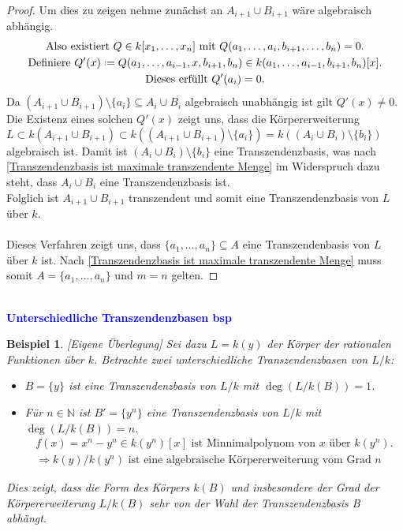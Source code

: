 \documentclass[10pt,a4paper]{report}
\newcommand{\comment}[1]{}
\newcounter{Aussage}[chapter]
\newtheorem{bsp}[Aussage]{Beispiel}
\newcommand*{\defeq}{\mathrel{\vcenter{\baselineskip0.5ex \lineskiplimit0pt
                     \hbox{\scriptsize.}\hbox{\scriptsize.}}}%
                     =}
\begin{document}
\begin{proof}
Um dies zu zeigen nehme zunächst an $A_{i+1} \cup B_{i+1}$ wäre algebraisch abhängig.
\begin{gather*}
\text{Also existiert } Q \in k[x_1, \dots ,x_n] \text{ mit } Q(a_1, \dots ,a_i,b_{i+1},\dots,b_n) = 0. \\
\text{Definiere } Q'(x) \defeq Q(a_1,\dots,a_{i-1},x,b_{i+1},b_n) \in k(a_1,\dots,a_{i-1},b_{i+1},b_n)[x]. \\
\text{Dieses erfüllt } Q'(a_i) = 0.
\end{gather*}
Da $(A_{i+1} \cup B_{i+1}) \setminus \lbrace a_i \rbrace \subseteq A_i \cup B_i$ algebraisch unabhängig ist gilt $Q'(x) \neq 0$.\\
Die Existenz eines solchen $Q'(x)$ zeigt uns, dass die Körpererweiterung \\$L \subset k(A_{i+1} \cup B_{i+1}) \subset k((A_{i+1} \cup B_{i+1})\setminus\lbrace a_i \rbrace) = k((A_i \cup B_i)\setminus\lbrace b_i \rbrace)$ algebraisch ist. Damit ist $(A_i\cup B_i)\setminus\lbrace b_i \rbrace$ eine Transzendenzbasis, was nach \cref{Transzendenzbasis ist maximale transzendente Menge} im Widerspruch dazu steht, dass $A_i \cup B_i$ eine Transzendenzbasis ist.\\
Folglich ist $A_{i+1} \cup B_{i+1}$ transzendent und somit eine Transzendenzbasis von $L$ über $k$.\ \\
\ \\
Dieses Verfahren zeigt uns, dass $\lbrace a_1, \dots , a_n \rbrace \subseteq A$ eine Transzendenbasis von $L$ über $k$ ist. Nach \cref{Transzendenzbasis ist maximale transzendente Menge} muss somit $A = \lbrace a_1, \dots , a_n \rbrace$ und $m = n$ gelten.
\end{proof}



\ \\
\textcolor{blue}{\textbf{Unterschiedliche Transzendenzbasen bsp}}
\begin{bsp}\comment{\label{Unterschiedliche Transzendenzbasen bsp}}\textit{[Eigene Überlegung]}
Sei dazu $L = k(y)$ der Körper der rationalen Funktionen über $k$. Betrachte zwei unterschiedliche Transzendenzbasen von $L/k$:
\begin{itemize}
\item[\textbf{1.}] $B = \lbrace y \rbrace$ ist eine Transzendenzbasis von $L/k$ mit $\deg(L/k(B)) = 1$.
\item[\textbf{2.}] Für $n \in \mathbb{N}$ ist $B'= \lbrace y^n\rbrace$ eine Transzendenzbasis von $L/k$ mit\\
$\deg(L/k(B)) = n$.
\begin{gather*}
f(x) = x^n - y^n \in k(y^n)[x] \text{ ist Minnimalpolynom von $x$ über $k(y^n)$.} \\
\Rightarrow k(y)/k(y^n) \text{ ist eine algebraische Körpererweiterung vom Grad $n$}
\end{gather*}
\end{itemize}
Dies zeigt, dass die Form des Körpers $k(B)$ und insbesondere der Grad der Körpererweiterung $L/k(B)$ sehr von der Wahl der Transzendenzbasis B abhängt.
\end{bsp}
\end{document}
